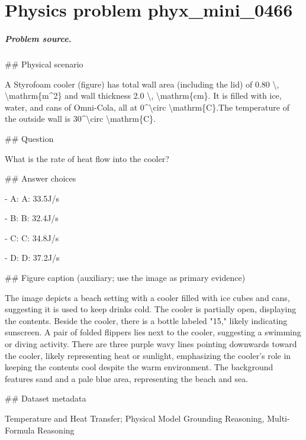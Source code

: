 
\chapter{Physics problem phyx\_mini\_0466}
\label{ch:PhyXMiniProblems_problem_phyx_mini_0466}

\paragraph{Problem source.}
\#\# Physical scenario

A Styrofoam cooler (figure) has total wall area (including the lid) of 0.80 \textbackslash{}, \textbackslash{}mathrm\{m\textasciicircum{}2\} and wall thickness 2.0 \textbackslash{}, \textbackslash{}mathrm\{cm\}. It is filled with ice, water, and cans of Omni-Cola, all at 0\textasciicircum{}\textbackslash{}circ \textbackslash{}mathrm\{C\}.The temperature of the outside wall is 30\textasciicircum{}\textbackslash{}circ \textbackslash{}mathrm\{C\}.

\#\# Question

What is the rate of heat flow into the cooler?

\#\# Answer choices

- A: A: 33.5J/s

- B: B: 32.4J/s

- C: C: 34.8J/s

- D: D: 37.2J/s

\#\# Figure caption (auxiliary; use the image as primary evidence)

The image depicts a beach setting with a cooler filled with ice cubes and cans, suggesting it is used to keep drinks cold. The cooler is partially open, displaying the contents. Beside the cooler, there is a bottle labeled "15," likely indicating sunscreen. A pair of folded flippers lies next to the cooler, suggesting a swimming or diving activity. There are three purple wavy lines pointing downwards toward the cooler, likely representing heat or sunlight, emphasizing the cooler's role in keeping the contents cool despite the warm environment. The background features sand and a pale blue area, representing the beach and sea.

\#\# Dataset metadata

Temperature and Heat Transfer; Physical Model Grounding Reasoning, Multi-Formula Reasoning

